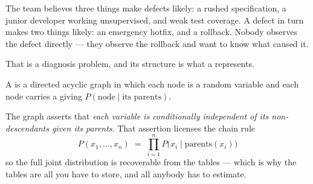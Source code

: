 The team believes three things make defects likely: a rushed specification, a
junior developer working unsupervised, and weak test coverage. A defect in turn
makes two things likely: an emergency hotfix, and a rollback. Nobody observes the
defect directly --- they observe the rollback and want to know what caused it.

That is a diagnosis problem, and its structure is what a 
represents.

\begin{definitionbox}
A  is a directed acyclic graph in which each node is a random
variable and each node carries a  giving
$P(\text{node} \mid \text{its parents})$.

The graph asserts that \emph{each variable is conditionally independent of its
non-descendants given its parents}. That assertion licenses the chain rule
\[
  P(x_{1}, \ldots, x_{n}) \;=\; \prod_{i=1}^{n}
  P\bigl(x_{i} \mid \mathrm{parents}(x_{i})\bigr)
\]
so the full joint distribution is recoverable from the tables --- which is why the
tables are all you have to store, and all anybody has to estimate.
\end{definitionbox}

